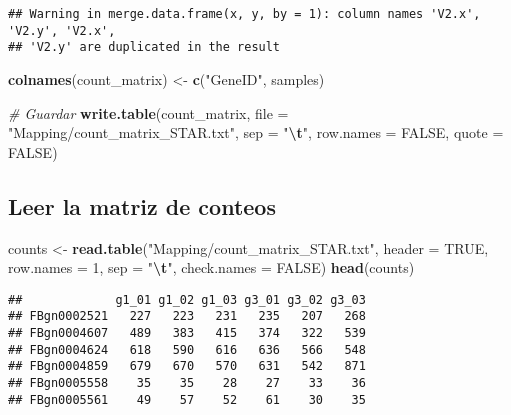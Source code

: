 \documentclass[
]{article}
\newenvironment{Shaded}{\begin{snugshade}}{\end{snugshade}}
\newcommand{\AttributeTok}[1]{\textcolor[rgb]{0.13,0.29,0.53}{#1}}
\newcommand{\CommentTok}[1]{\textcolor[rgb]{0.56,0.35,0.01}{\textit{#1}}}
\newcommand{\ConstantTok}[1]{\textcolor[rgb]{0.56,0.35,0.01}{#1}}
\newcommand{\DecValTok}[1]{\textcolor[rgb]{0.00,0.00,0.81}{#1}}
\newcommand{\FunctionTok}[1]{\textcolor[rgb]{0.13,0.29,0.53}{\textbf{#1}}}
\newcommand{\NormalTok}[1]{#1}
\newcommand{\OtherTok}[1]{\textcolor[rgb]{0.56,0.35,0.01}{#1}}
\newcommand{\SpecialCharTok}[1]{\textcolor[rgb]{0.81,0.36,0.00}{\textbf{#1}}}
\newcommand{\StringTok}[1]{\textcolor[rgb]{0.31,0.60,0.02}{#1}}
\begin{document}
\begin{verbatim}
## Warning in merge.data.frame(x, y, by = 1): column names 'V2.x', 'V2.y', 'V2.x',
## 'V2.y' are duplicated in the result
\end{verbatim}

\begin{Shaded}
\begin{Highlighting}[]
\FunctionTok{colnames}\NormalTok{(count\_matrix) }\OtherTok{\textless{}{-}} \FunctionTok{c}\NormalTok{(}\StringTok{"GeneID"}\NormalTok{, samples)}

\CommentTok{\# Guardar}
\FunctionTok{write.table}\NormalTok{(count\_matrix, }\AttributeTok{file =} \StringTok{"Mapping/count\_matrix\_STAR.txt"}\NormalTok{, }\AttributeTok{sep =} \StringTok{"}\SpecialCharTok{\textbackslash{}t}\StringTok{"}\NormalTok{, }\AttributeTok{row.names =} \ConstantTok{FALSE}\NormalTok{, }\AttributeTok{quote =} \ConstantTok{FALSE}\NormalTok{)}
\end{Highlighting}
\end{Shaded}

\subsection{Leer la matriz de conteos}\label{leer-la-matriz-de-conteos}

\begin{Shaded}
\begin{Highlighting}[]
\NormalTok{counts }\OtherTok{\textless{}{-}} \FunctionTok{read.table}\NormalTok{(}\StringTok{"Mapping/count\_matrix\_STAR.txt"}\NormalTok{, }\AttributeTok{header =} \ConstantTok{TRUE}\NormalTok{, }\AttributeTok{row.names =} \DecValTok{1}\NormalTok{, }\AttributeTok{sep =} \StringTok{"}\SpecialCharTok{\textbackslash{}t}\StringTok{"}\NormalTok{, }\AttributeTok{check.names =} \ConstantTok{FALSE}\NormalTok{)}
\FunctionTok{head}\NormalTok{(counts)}
\end{Highlighting}
\end{Shaded}

\begin{verbatim}
##             g1_01 g1_02 g1_03 g3_01 g3_02 g3_03
## FBgn0002521   227   223   231   235   207   268
## FBgn0004607   489   383   415   374   322   539
## FBgn0004624   618   590   616   636   566   548
## FBgn0004859   679   670   570   631   542   871
## FBgn0005558    35    35    28    27    33    36
## FBgn0005561    49    57    52    61    30    35
\end{verbatim}
\end{document}
